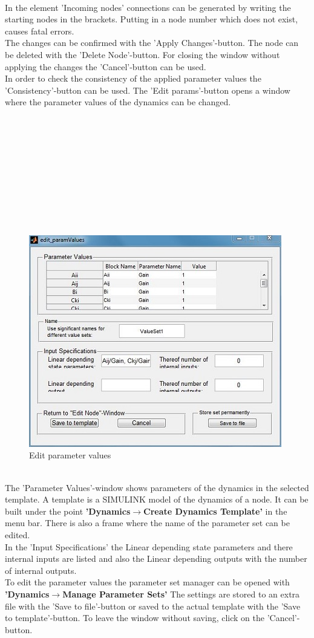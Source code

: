 \documentclass[12pt]{report}
\begin{document}
\\
In the element 'Incoming nodes' connections can be generated by writing the starting nodes in the brackets. Putting in a node number which does not exist, causes fatal errors.\\
The changes can be confirmed with the 'Apply Changes'-button. The node can be deleted with the 'Delete Node'-button. For closing the window without applying the changes the 'Cancel'-button can be used.\\
In order to check the consistency of the applied parameter values the 'Consistency'-button can be used. The 'Edit params'-button opens a window where the parameter values of the dynamics can be changed.\\
\\
\\
\\
\\
\\
\\
\\
\\
\\
\\
\begin{figure}[h]
\centering
\includegraphics[scale=.8]{editparaval}
\caption{Edit parameter values}
\label{FIG:abb29}
\end{figure}
\\
The 'Parameter Values'-window shows parameters of the dynamics in the selected template. A template is a SIMULINK model of the dynamics of a node. It can be built under the point \textbf{'Dynamics$\rightarrow$Create Dynamics Template'} in the menu bar. There is also a frame where the name of the parameter set can be edited.\\
In the 'Input Specifications' the Linear depending state parameters and there internal inputs are listed and also the Linear depending outputs with the number of internal outputs.\\
To edit the parameter values the parameter set manager can be opened with \textbf{'Dynamics$\rightarrow$Manage Parameter Sets'}
The settings are stored to an extra file with the 'Save to file'-button or saved to the actual template with the 'Save to template'-button. To leave the window without saving, click on the 'Cancel'-button.\\
\\
\end{document}
